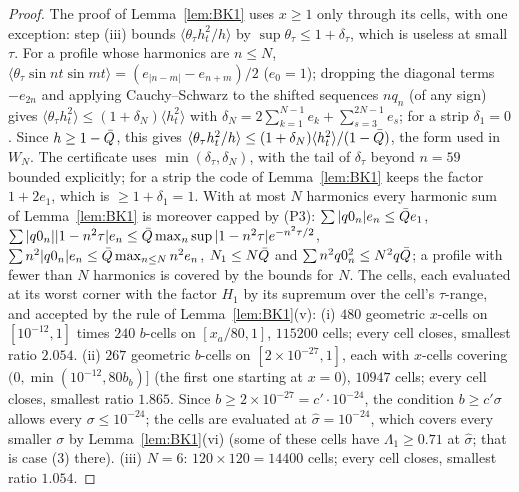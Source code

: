 \begin{proof}
The proof of Lemma~\ref{lem:BK1} uses $x\ge1$ only through its cells, with one exception: step (iii) bounds $\langle\theta_\tau h_t^2/h\rangle$ by
$\sup\theta_\tau\le1+\delta_\tau$, which is useless at small $\tau$. For a profile whose harmonics are $n\le N$,
$\langle\theta_\tau\sin nt\sin mt\rangle=(e_{|n-m|}-e_{n+m})/2$ ($e_0=1$); dropping the diagonal terms $-e_{2n}$ and applying Cauchy--Schwarz to the
shifted sequences $nq_n$ (of any sign) gives $\langle\theta_\tau h_t^2\rangle\le(1+\delta_N)\langle h_t^2\rangle$ with
$\delta_N=2\sum_{k=1}^{N-1}e_k+\sum_{s=3}^{2N-1}e_s$; for a strip $\delta_1=0$. Since $h\ge1-\bar Q$, this gives $\langle\theta_\tau h_t^2/h\rangle\le(1+\delta_N)\langle h_t^2\rangle/(1-\bar Q)$, the form used in $W_N$. The certificate uses $\min(\delta_\tau,\delta_N)$, with the tail of $\delta_\tau$
beyond $n=59$ bounded explicitly; for a strip the code of Lemma~\ref{lem:BK1} keeps the factor $1+2e_1$, which is
$\ge1+\delta_1=1$. With at most $N$ harmonics every harmonic sum of Lemma~\ref{lem:BK1} is
moreover capped by (P3): $\sum|q0_n|e_n\le\bar Q e_1$, $\sum|q0_n||1-n^2\tau|e_n\le\bar Q\max_n\sup|1-n^2\tau|e^{-n^2\tau/2}$, $\sum n^2|q0_n|e_n\le\bar Q\max_{n\le N}n^2e_n$,
$N_1\le N\bar Q$ and $\sum n^2q0_n^2\le N^2q\bar Q$; a profile with fewer than $N$ harmonics is covered by the bounds for $N$.
The cells, each evaluated at its worst corner with the factor $H_1$ by its supremum over the cell's $\tau$-range, and accepted by the rule of
Lemma~\ref{lem:BK1}(v):
(i) $480$ geometric $x$-cells on $[10^{-12},1]$ times $240$ $b$-cells on $[x_a/80,1]$, $115200$ cells; every cell closes, smallest ratio $2.054$.
(ii) $267$ geometric $b$-cells on $[2\times10^{-27},1]$, each with $x$-cells covering $(0,\min(10^{-12},80b_b)]$ (the first one starting at $x=0$),
$10947$ cells; every cell closes, smallest ratio $1.865$. Since $b\ge2\times10^{-27}=c'\cdot10^{-24}$, the condition $b\ge c'\sigma$ allows every
$\sigma\le10^{-24}$; the cells are evaluated at $\hat\sigma=10^{-24}$, which covers every smaller $\sigma$ by Lemma~\ref{lem:BK1}(vi) (some of these
cells have $\Lambda_1\ge0.71$ at $\hat\sigma$; that is case (3) there).
(iii) $N=6$: $120\times120=14400$ cells; every cell closes, smallest ratio $1.054$.
\end{proof}

